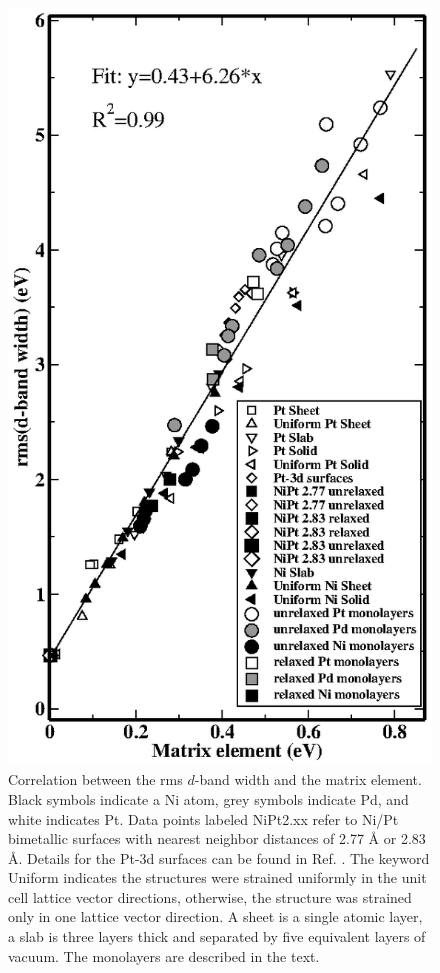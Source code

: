 \documentclass[aps,prl,twocolumn,superscriptaddress,showkeys]{revtex4}
\begin{document}
\begin{figure}
\includegraphics{Fig2}
\caption{Correlation between the rms $d$-band width and the matrix
  element. Black symbols indicate a Ni atom, grey symbols indicate Pd,
  and white indicates Pt. Data points labeled NiPt2.xx refer to Ni/Pt
  bimetallic surfaces with nearest neighbor distances of 2.77 \AA{} or
  2.83 \AA \cite{kitchin2003:_elucid_ni_pt}. Details for the Pt-3d
  surfaces can be found in Ref.
  \citealp{kitchin2004:_modif_surfac_elect_chemic_proper}. The keyword
  Uniform indicates the structures were strained uniformly in the unit
  cell lattice vector directions, otherwise, the structure was
  strained only in one lattice vector direction. A sheet is a single
  atomic layer, a slab is three layers thick and separated by five
  equivalent layers of vacuum. The monolayers are described in the
  text.
  \label{fig:vw}}
\end{figure}
\end{document}
